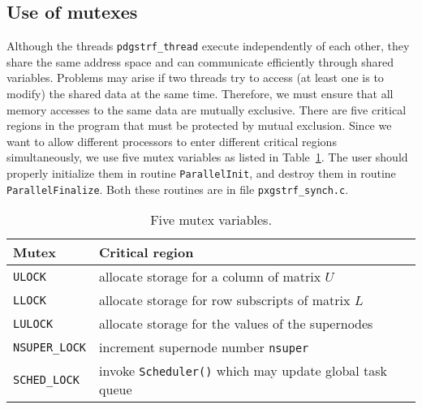 \subsection{Use of mutexes}
Although the threads {\tt pdgstrf\_thread} execute independently of each
other, they share the same address space and can communicate efficiently
through shared variables. Problems may arise if two threads try to access
(at least one is to modify) the shared data at the same time.
Therefore, we must ensure that all memory accesses to the same data
are mutually exclusive. There are five critical regions in the
program that must be protected by mutual exclusion. Since we want
to allow different processors to enter different critical regions
simultaneously, we use five mutex variables as listed
in Table~\ref{tab:mutexes}. The user should properly initialize them in 
routine {\tt ParallelInit}, and destroy them in routine {\tt ParallelFinalize}.
Both these routines are in file {\tt pxgstrf\_synch.c}.


\begin{table}
\begin{center}
\begin{tabular}{|l|l|}\hline
Mutex		&Critical region \\ \hline
{\tt ULOCK}	&allocate storage for a column of matrix $U$ \\
{\tt LLOCK}	&allocate storage for row subscripts of matrix $L$\\
{\tt LULOCK}	&allocate storage for the values of the supernodes\\
{\tt NSUPER\_LOCK}&increment supernode number {\tt nsuper}\\
{\tt SCHED\_LOCK} &invoke {\tt Scheduler()} which may update global task queue\\
\hline
\end{tabular}
\end{center}
\vspace{-.1in}
\caption{Five mutex variables.}
\label{tab:mutexes}
\end{table}

